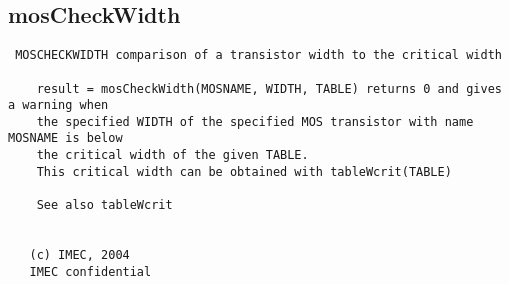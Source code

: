 \newpage
\subsection{mosCheckWidth}
\label{sec:mosCheckWidth}
\begin{verbatim}
 MOSCHECKWIDTH comparison of a transistor width to the critical width
 
    result = mosCheckWidth(MOSNAME, WIDTH, TABLE) returns 0 and gives a warning when
    the specified WIDTH of the specified MOS transistor with name MOSNAME is below 
    the critical width of the given TABLE.
    This critical width can be obtained with tableWcrit(TABLE)
 
    See also tableWcrit
 
 
   (c) IMEC, 2004
   IMEC confidential 
 

\end{verbatim}

\newpage
